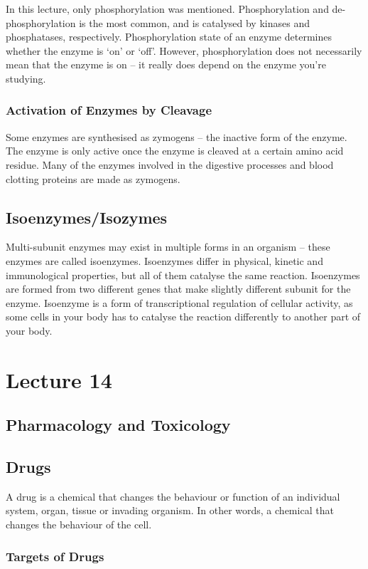 \documentclass[a4paper, 12pt]{report}
\newcommand{\mychapter}[2]{
    \setcounter{chapter}{#1}
    \setcounter{section}{0}
    \chapter*{#2}
    \addcontentsline{toc}{chapter}{#2}
}
\begin{document}
In this lecture, only phosphorylation was mentioned.
Phosphorylation and de-phosphorylation is the most common, and is catalysed by kinases and phosphatases, respectively.
Phosphorylation state of an enzyme determines whether the enzyme is `on' or `off'.
However, phosphorylation does not necessarily mean that the enzyme is on -- it really does depend on the enzyme you're studying.

\subsection{Activation of Enzymes by Cleavage}

Some enzymes are synthesised as zymogens -- the inactive form of the enzyme.
The enzyme is only active once the enzyme is cleaved at a certain amino acid residue.
Many of the enzymes involved in the digestive processes and blood clotting proteins are made as zymogens.

\section{Isoenzymes/Isozymes}

Multi-subunit enzymes may exist in multiple forms in an organism -- these enzymes are called isoenzymes.
Isoenzymes differ in physical, kinetic and immunological properties, but all of them catalyse the same reaction.
Isoenzymes are formed from two different genes that make slightly different subunit for the enzyme.
Isoenzyme is a form of transcriptional regulation of cellular activity, as some cells in your body has to catalyse the reaction differently to another part of your body.

\mychapter{14}{Lecture 14}

\section{Pharmacology and Toxicology}

\section{Drugs}

A drug is a chemical that changes the behaviour or function of an individual system, organ, tissue or invading organism.
In other words, a chemical that changes the behaviour of the cell.

\subsection{Targets of Drugs}
\end{document}
